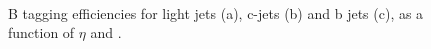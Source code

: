 \begin{figure}[!h]
\centering
{}
\\
\caption{B tagging efficiencies for light jets (a), c-jets (b) and
b jets (c), as a function of $\eta$ and \pt.\label{fig:effmc}}
\end{figure}

